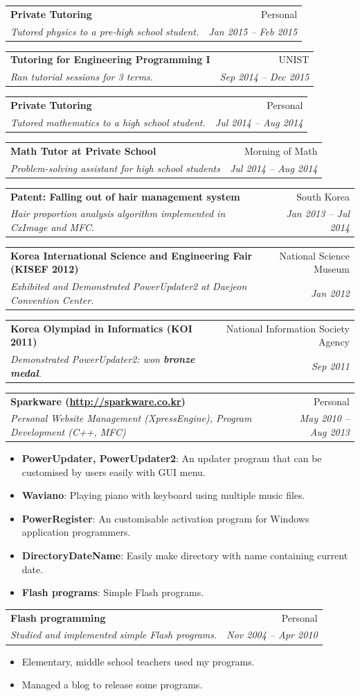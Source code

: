 \documentclass[letterpaper,11pt]{article}
\makeatletter
\def \includeMinor {}
\newcommand{\resumeItem}[2]{
  \item\small{
    \textbf{#1}{: #2 \vspace{-2pt}}
  }
}
\newcommand{\resumeSimpleItem}[1]{
  \item\small{
    {#1 \vspace{-2pt}}
  }
}
\newcommand{\resumeSubheading}[4]{
  \vspace{-1pt}\item
    \begin{tabular*}{0.97\textwidth}{l@{\extracolsep{\fill}}r}
      \textbf{#1} & #2 \\
      \textit{\small#3} & \textit{\small #4} \\
    \end{tabular*}\vspace{-5pt}
}
\newcommand{\resumeItemListStart}{\begin{itemize}}
\newcommand{\resumeItemListEnd}{\end{itemize}\vspace{-5pt}}
\makeatother
\begin{document}
    \ifdefined \includeMinor
    \resumeSubheading
      {Private Tutoring}{Personal}
      {Tutored physics to a pre-high school student.}{Jan 2015 -- Feb 2015}
    \fi
      
    \resumeSubheading
      {Tutoring for Engineering Programming I}{UNIST}
      {Ran tutorial sessions for 3 terms.}{Sep 2014 -- Dec 2015}
      
    \ifdefined \includeMinor
    \resumeSubheading
      {Private Tutoring}{Personal}
      {Tutored mathematics to a high school student.}{Jul 2014 -- Aug 2014}
    \fi
      
    \ifdefined \includeMinor
    \resumeSubheading
      {Math Tutor at Private School}{Morning of Math}
      {Problem-solving assistant for high school students}{Jul 2014 -- Aug 2014}
    \fi
      
    \ifx \disallowBlankTerm{} \undefined
    \resumeSubheading
      {Patent: Falling out of hair management system}{South Korea}
      {Hair proportion analysis algorithm implemented in CxImage and MFC.}{Jan 2013 -- Jul 2014}
    \fi
      
    \resumeSubheading
      {Korea International Science and Engineering Fair (KISEF 2012)}{National Science Museum}
      {Exhibited and Demonstrated PowerUpdater2 at Daejeon Convention Center.}{Jan 2012}
      
    \resumeSubheading
      {Korea Olympiad in Informatics (KOI 2011)}{National Information Society Agency}
      {Demonstrated PowerUpdater2: won \textbf{bronze medal}.}{Sep 2011}
      
    \resumeSubheading
      {Sparkware (\href{http://sparkware.co.kr}{http://sparkware.co.kr})}{Personal}
      {Personal Website Management (XpressEngine), Program Development (C++, MFC)}{May 2010 -- Aug 2013}
      \resumeItemListStart
        \resumeItem{PowerUpdater, PowerUpdater2}
          {An updater program that can be customised by users easily with GUI menu.}
        \resumeItem{Waviano}
          {Playing piano with keyboard using multiple music files.}
        \resumeItem{PowerRegister}
          {An customisable activation program for Windows application programmers.}
        \resumeItem{DirectoryDateName}
          {Easily make directory with name containing current date.}
        \resumeItem{Flash programs}
          {Simple Flash programs.}
          \resumeItemListEnd
          
    \ifdefined \includeMinor
    \resumeSubheading
      {Flash programming}{Personal}
      {Studied and implemented simple Flash programs.}{Nov 2004 -- Apr 2010}
      \resumeItemListStart
        \resumeSimpleItem{Elementary, middle school teachers used my programs.}
        \resumeSimpleItem{Managed a blog to release some programs.}
      \resumeItemListEnd
    \fi
\end{document}
